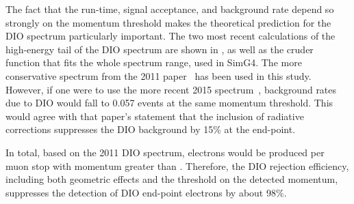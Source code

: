 \FigDIOEndPointComparison
The fact that the run-time, signal acceptance, and background rate depend so strongly on the momentum threshold makes the theoretical prediction for the \ac{DIO} spectrum particularly important.
The two most recent calculations of the high-energy tail of the DIO spectrum are shown in , as well as the cruder function that fits the whole spectrum range, used in SimG4.
The more conservative spectrum from the 2011 paper~\cite{Czarnecki2011} has been used in this study.
However, if one were to use the more recent 2015 spectrum~\cite{Czarnecki2014}, background rates due to DIO would fall to 0.057 events at the same momentum threshold.
This would agree with that paper's statement that the inclusion of radiative corrections suppresses the DIO background by 15\% at the end-point.

In total, based on the 2011 DIO spectrum,  electrons would be produced per muon stop with momentum greater than \VarMomThreshold.
Therefore, the DIO rejection efficiency, including both geometric effects and the threshold on the detected momentum, suppresses the detection of DIO end-point electrons by about 98\%.

